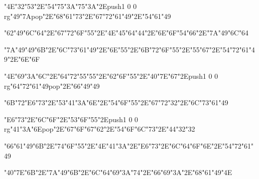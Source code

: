 \centerline{\ipa\char"4E\ipa\char"32\ipa\char"53\ipa\char"2E\ipa\char"54\ipa\char"75\ipa\char"3A\ipa\char"75\ipa\char"3A\ipa\char"2E\pdfcolorstack\match push{1 0 0 rg}\ipa\char"49\ipa\char"7A\pdfcolorstack\match pop{}\ipa\char"2E\ipa\char"68\ipa\char"61\ipa\char"73\ipa\char"2E\ipa\char"67\ipa\char"72\ipa\char"61\ipa\char"49\ipa\char"2E\ipa\char"54\ipa\char"61\ipa\char"49}
\vfill\eject
\null\vfill
\centerline{\ipa\char"62\ipa\char"49\ipa\char"6C\ipa\char"64\ipa\char"2E\ipa\char"67\ipa\char"72\ipa\char"6F\ipa\char"55\ipa\char"2E\ipa\char"4E\ipa\char"45\ipa\char"64\ipa\char"44\ipa\char"2E\ipa\char"6E\ipa\char"6F\ipa\char"54\ipa\char"66\ipa\char"2E\ipa\char"7A\ipa\char"49\ipa\char"6C\ipa\char"64}\bigskip
\centerline{\ipa\char"7A\ipa\char"49\ipa\char"49\ipa\char"6B\ipa\char"2E\ipa\char"6C\ipa\char"73\ipa\char"61\ipa\char"49\ipa\char"2E\ipa\char"6E\ipa\char"55\ipa\char"2E\ipa\char"6B\ipa\char"72\ipa\char"6F\ipa\char"55\ipa\char"2E\ipa\char"55\ipa\char"67\ipa\char"2E\ipa\char"54\ipa\char"72\ipa\char"61\ipa\char"49\ipa\char"2E\ipa\char"6E\ipa\char"6F}\bigskip
\centerline{\ipa\char"4E\ipa\char"69\ipa\char"3A\ipa\char"6C\ipa\char"2E\ipa\char"64\ipa\char"72\ipa\char"55\ipa\char"55\ipa\char"2E\ipa\char"62\ipa\char"6F\ipa\char"55\ipa\char"2E\ipa\char"40\ipa\char"7E\ipa\char"67\ipa\char"2E\pdfcolorstack\match push{1 0 0 rg}\ipa\char"64\ipa\char"72\ipa\char"61\ipa\char"49\pdfcolorstack\match pop{}\ipa\char"2E\ipa\char"66\ipa\char"49\ipa\char"49}
\vfill\eject
\null\vfill
\centerline{\ipa\char"6B\ipa\char"72\ipa\char"E6\ipa\char"73\ipa\char"2E\ipa\char"53\ipa\char"41\ipa\char"3A\ipa\char"6E\ipa\char"2E\ipa\char"54\ipa\char"6F\ipa\char"55\ipa\char"2E\ipa\char"67\ipa\char"72\ipa\char"32\ipa\char"2E\ipa\char"6C\ipa\char"73\ipa\char"61\ipa\char"49}\bigskip
\centerline{\ipa\char"E6\ipa\char"73\ipa\char"2E\ipa\char"6C\ipa\char"6F\ipa\char"2E\ipa\char"53\ipa\char"6F\ipa\char"55\ipa\char"2E\pdfcolorstack\match push{1 0 0 rg}\ipa\char"41\ipa\char"3A\ipa\char"6E\pdfcolorstack\match pop{}\ipa\char"2E\ipa\char"67\ipa\char"6F\ipa\char"67\ipa\char"62\ipa\char"2E\ipa\char"54\ipa\char"6F\ipa\char"6C\ipa\char"73\ipa\char"2E\ipa\char"44\ipa\char"32\ipa\char"32}\bigskip
\centerline{\ipa\char"66\ipa\char"61\ipa\char"49\ipa\char"6B\ipa\char"2E\ipa\char"74\ipa\char"6F\ipa\char"55\ipa\char"2E\ipa\char"4E\ipa\char"41\ipa\char"3A\ipa\char"2E\ipa\char"E6\ipa\char"73\ipa\char"2E\ipa\char"6C\ipa\char"64\ipa\char"6F\ipa\char"6E\ipa\char"2E\ipa\char"54\ipa\char"72\ipa\char"61\ipa\char"49}
\vfill\eject
\null\vfill
\centerline{\ipa\char"40\ipa\char"7E\ipa\char"6B\ipa\char"2E\ipa\char"7A\ipa\char"49\ipa\char"6B\ipa\char"2E\ipa\char"6C\ipa\char"64\ipa\char"69\ipa\char"3A\ipa\char"74\ipa\char"2E\ipa\char"66\ipa\char"69\ipa\char"3A\ipa\char"2E\ipa\char"68\ipa\char"61\ipa\char"49\ipa\char"4E}\bigskip
